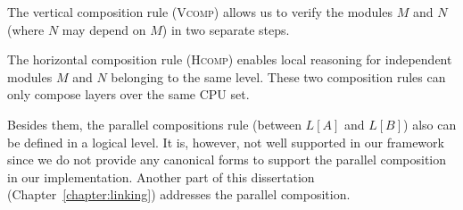 The vertical composition rule (\textsc{Vcomp}) allows us
to verify the modules $M$ and $N$ (where $N$ may depend on $M$) 
in two separate steps.
    \begin{mathpar}
\end{mathpar}

The horizontal composition rule
(\textsc{Hcomp}) enables local reasoning for independent
modules $M$ and $N$ belonging to the same level. These two composition rules can only compose layers over the same  CPU set.
 \begin{mathpar}
\end{mathpar}

Besides them, 
the parallel compositions rule (between $L[A]$ and $L[B]$) 
also can be defined in a logical level. 
It is, however, not well supported in our framework since we do not provide
any canonical forms to support the parallel composition 
in our implementation.
Another part of this dissertation (Chapter~\ref{chapter:linking}) addresses 
the parallel composition. 




